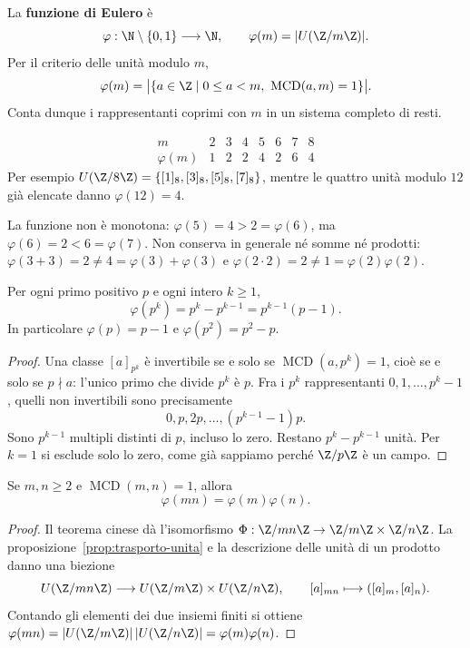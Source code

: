 \begin{definizione}
La \textbf{funzione di Eulero} è
\[
\varphi:\N\setminus\{0,1\}\longrightarrow\N,\qquad
\varphi(m)=|U(\Z/m\Z)|.
\]
Per il criterio delle unità modulo $m$,
\[
\varphi(m)=\bigl|\{a\in\Z\mid 0\le a<m,\ \operatorname{MCD}(a,m)=1\}\bigr|.
\]
Conta dunque i rappresentanti coprimi con $m$ in un sistema completo di resti.
\end{definizione}

\begin{esempio}
\[
\begin{array}{c|rrrrrrr}
m&2&3&4&5&6&7&8\\\hline
\varphi(m)&1&2&2&4&2&6&4
\end{array}
\]
Per esempio $U(\Z/8\Z)=\{[1]_8,[3]_8,[5]_8,[7]_8\}$, mentre le quattro unità modulo $12$ già elencate danno $\varphi(12)=4$.

La funzione non è monotona: $\varphi(5)=4>2=\varphi(6)$, ma $\varphi(6)=2<6=\varphi(7)$. Non conserva in generale né somme né prodotti: $\varphi(3+3)=2\ne4=\varphi(3)+\varphi(3)$ e $\varphi(2\cdot2)=2\ne1=\varphi(2)\varphi(2)$.
\end{esempio}

\begin{proposizione}\label{prop:eulero-potenze}
Per ogni primo positivo $p$ e ogni intero $k\ge1$,
\[
\varphi(p^k)=p^k-p^{k-1}=p^{k-1}(p-1).
\]
In particolare $\varphi(p)=p-1$ e $\varphi(p^2)=p^2-p$.
\end{proposizione}
\begin{proof}
Una classe $[a]_{p^k}$ è invertibile se e solo se $\operatorname{MCD}(a,p^k)=1$, cioè se e solo se $p\nmid a$: l'unico primo che divide $p^k$ è $p$. Fra i $p^k$ rappresentanti $0,1,\ldots,p^k-1$, quelli non invertibili sono precisamente
\[
0,p,2p,\ldots,(p^{k-1}-1)p.
\]
Sono $p^{k-1}$ multipli distinti di $p$, incluso lo zero. Restano $p^k-p^{k-1}$ unità. Per $k=1$ si esclude solo lo zero, come già sappiamo perché $\Z/p\Z$ è un campo.
\end{proof}

\begin{proposizione}\label{prop:eulero-coprimi}
Se $m,n\ge2$ e $\operatorname{MCD}(m,n)=1$, allora
\[
\varphi(mn)=\varphi(m)\varphi(n).
\]
\end{proposizione}
\begin{proof}
Il teorema cinese dà l'isomorfismo $\Phi:\Z/mn\Z\to\Z/m\Z\times\Z/n\Z$. La proposizione~\ref{prop:trasporto-unita} e la descrizione delle unità di un prodotto danno una biezione
\[
U(\Z/mn\Z)\longrightarrow U(\Z/m\Z)\times U(\Z/n\Z),
\qquad [a]_{mn}\longmapsto([a]_m,[a]_n).
\]
Contando gli elementi dei due insiemi finiti si ottiene $\varphi(mn)=|U(\Z/m\Z)|\,|U(\Z/n\Z)|=\varphi(m)\varphi(n)$.
\end{proof}

